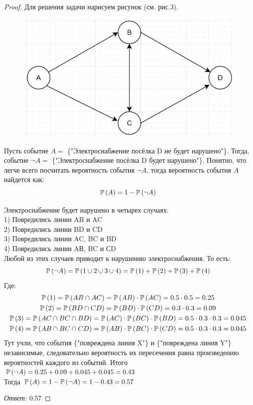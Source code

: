 \begin{proof}
Для решения задачи нарисуем рисунок (см. рис.3).
\begin{figure}
    \centering
    \includegraphics[width=0.5\linewidth]{3.png}
    \caption{}
    \label{fig:enter-label}
\end{figure}

Пусть событие $ A = $ \{"Электроснабжение посёлка D не будет нарушено"\}. Тогда, событие $ \neg A = $ \{"Электроснабжение посёлка D будет нарушено"\}. Понятно, что легче всего посчитать вероятность события $ \neg A $, тогда вероятность события $ A $ найдется как:
\[
\mathbb P\left(A\right) = 1 - \mathbb P\left(\neg A\right)
\]

Электроснабжение будет нарушено в четырех случаях:\\
1) Повредились линии AB и AC\\
2) Повредились линии BD и CD\\
3) Повредились линии AC, BC и BD\\
4) Повредились линии AВ, BC и СD\\
Любой из этих случаев приводит к нарушению электроснабжения.
То есть:
\[
\mathbb P\left(\neg A\right) = \mathbb P\left(1\cup 2\cup 3\cup 4\right) = \mathbb P\left(1\right) + \mathbb P\left(2\right) + \mathbb P\left(3\right) + \mathbb P\left(4\right)
\]
Где:
\begin{gather*}
    \mathbb P\left(1\right) = \mathbb P\left(AB\cap AC\right) = \mathbb P\left(AB\right)\cdot\mathbb P\left(AC\right) = 0.5\cdot 0.5 = 0.25\\
    \mathbb P\left(2\right) = \mathbb P\left(BD\cap CD\right) = \mathbb P\left(BD\right)\cdot\mathbb P\left(CD\right) = 0.3\cdot 0.3 = 0.09\\
    \mathbb P\left(3\right) = \mathbb P\left(AC\cap BC\cap BD\right) = \mathbb P\left(AC\right)\cdot\mathbb P\left(BC\right)\cdot\mathbb P\left(BD\right) = 0.5\cdot 0.3\cdot 0.3 = 0.045\\
    \mathbb P\left(4\right) = \mathbb P\left(AB\cap BC\cap CD\right) = \mathbb P\left(AB\right)\cdot\mathbb P\left(BC\right)\cdot\mathbb P\left(CD\right) = 0.5\cdot 0.3\cdot 0.3 = 0.045
\end{gather*}
Тут учли, что события \{"повреждена линия X"\} и \{"повреждена линия Y"\} независимые, следовательно вероятность их пересечения равна произведению вероятностей каждого из событий.
Итого $ \mathbb P\left(\neg A\right) = 0.25 + 0.09 + 0.045 + 0.045 = 0.43 $\\
Тогда $ \mathbb P\left(A\right) = 1 - \mathbb P\left(\neg A\right) = 1 - 0.43 = 0.57$

{\it Ответ:} 0.57
\end{proof}

